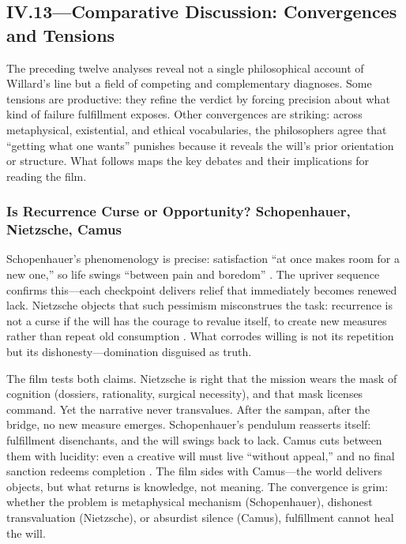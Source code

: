 \subsection*{IV.13—Comparative Discussion: Convergences and Tensions}
\label{ssec:iv-comparative-discussion}

The preceding twelve analyses reveal not a single philosophical account of Willard's line but
a field of competing and complementary diagnoses. Some tensions are productive: they refine
the verdict by forcing precision about what kind of failure fulfillment exposes. Other
convergences are striking: across metaphysical, existential, and ethical vocabularies, the
philosophers agree that ``getting what one wants'' punishes because it reveals the will's
prior orientation or structure. What follows maps the key debates and their implications for
reading the film.

\subsubsection*{Is Recurrence Curse or Opportunity? Schopenhauer, Nietzsche, Camus}

Schopenhauer's phenomenology is precise: satisfaction ``at once makes room for a new one,'' so
life swings ``between pain and boredom'' \parencite[pp.~312, 319]{SchopenhauerWWR1969}. The
upriver sequence confirms this---each checkpoint delivers relief that immediately becomes
renewed lack. Nietzsche objects that such pessimism misconstrues the task: recurrence is not a
curse if the will has the courage to revalue itself, to create new measures rather than repeat
old consumption \parencite[\S\S 34, 283]{NietzscheBGE1990}. What corrodes willing is not its
repetition but its dishonesty---domination disguised as truth.

The film tests both claims. Nietzsche is right that the mission wears the mask of cognition
(dossiers, rationality, surgical necessity), and that mask licenses command. Yet the narrative
never transvalues. After the sampan, after the bridge, no new measure emerges. Schopenhauer's
pendulum reasserts itself: fulfillment disenchants, and the will swings back to lack. Camus
cuts between them with lucidity: even a creative will must live ``without appeal,'' and no
final sanction redeems completion \parencite[pp.~28, 54, 121--123]{CamusMyth1991}. The film
sides with Camus---the world delivers objects, but what returns is knowledge, not meaning. The
convergence is grim: whether the problem is metaphysical mechanism (Schopenhauer), dishonest
transvaluation (Nietzsche), or absurdist silence (Camus), fulfillment cannot heal the will.

